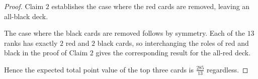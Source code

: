 \documentclass{article}
\begin{document}
\begin{proof}
    Claim $2$ establishes the case where the red cards are removed, leaving an all-black deck.

    \medskip

    The case where the black cards are removed follows by symmetry. Each of the $13$ ranks has exactly $2$ 
    red and $2$ black cards, so interchanging the roles of red and black in the proof of Claim $2$ gives the 
    corresponding result for the all-red deck.

    \medskip

    Hence the expected total point value of the top three cards is $\frac{285}{13}$ regardless.
\end{proof}
\end{document}
